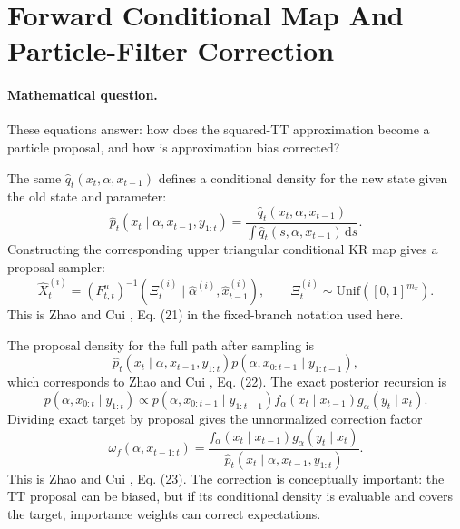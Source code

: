 \documentclass[11pt]{article}
\numberwithin{equation}{section}
\newcommand{\dd}{\,\mathrm d}
\begin{document}
\section{Forward Conditional Map And Particle-Filter Correction}

\paragraph{Mathematical question.}
These equations answer: how does the squared-TT approximation become a
particle proposal, and how is approximation bias corrected?

The same \(\widehat q_t(x_t,\alpha,x_{t-1})\) defines a conditional density for
the new state given the old state and parameter:
\begin{equation}
    \widehat p_t(x_t\mid \alpha,x_{t-1},y_{1:t})
    =
    \frac{\widehat q_t(x_t,\alpha,x_{t-1})}
    {\int \widehat q_t(s,\alpha,x_{t-1})\dd s}.
    \label{eq:p24-f1}
\end{equation}
Constructing the corresponding upper triangular conditional KR map gives a
proposal sampler:
\begin{equation}
    \widehat X_t^{(i)}
    =
    (F_{t,t}^{u})^{-1}
    \left(\Xi_t^{(i)}\mid \widehat\alpha^{(i)},\widehat x_{t-1}^{(i)}\right),
    \qquad
    \Xi_t^{(i)}\sim\mathrm{Unif}([0,1]^{m_x}).
    \label{eq:p24-f2}
\end{equation}
This is Zhao and Cui \cite{zhao2024ttsequential}, Eq. (21) in the fixed-branch notation used here.

The proposal density for the full path after sampling is
\begin{equation}
    \widehat p_t(x_t\mid \alpha,x_{t-1},y_{1:t})
    p(\alpha,x_{0:t-1}\mid y_{1:t-1}),
    \label{eq:p24-f3}
\end{equation}
which corresponds to Zhao and Cui \cite{zhao2024ttsequential}, Eq. (22).  The exact posterior recursion is
\[
    p(\alpha,x_{0:t}\mid y_{1:t})
    \propto
    p(\alpha,x_{0:t-1}\mid y_{1:t-1})
    f_\alpha(x_t\mid x_{t-1})
    g_\alpha(y_t\mid x_t).
\]
Dividing exact target by proposal gives the unnormalized correction factor
\begin{equation}
    \omega_f(\alpha,x_{t-1:t})
    =
    \frac{
    f_\alpha(x_t\mid x_{t-1})g_\alpha(y_t\mid x_t)}
    {\widehat p_t(x_t\mid \alpha,x_{t-1},y_{1:t})}.
    \label{eq:p24-f4}
\end{equation}
This is Zhao and Cui \cite{zhao2024ttsequential}, Eq. (23).  The correction is conceptually important: the TT
proposal can be biased, but if its conditional density is evaluable and covers
the target, importance weights can correct expectations.
\end{document}
